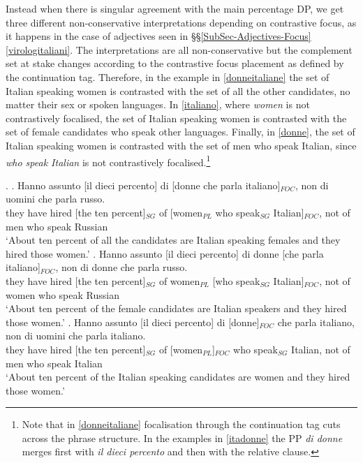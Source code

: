 \documentclass[charis, linguex]{glossa}
\begin{document}
Instead when there is singular agreement with the main percentage DP, we get three different non-conservative interpretations depending on contrastive focus, as it happens in the case of adjectives seen in \S\S\ref{SubSec-Adjectives-Focus} \ref{virologitaliani}. The interpretations are all non-conservative but the complement set at stake changes according to the contrastive focus placement as defined by the continuation tag. Therefore, in the example in \ref{donneitaliane} the set of Italian speaking women is contrasted with the set of all the other candidates, no matter their sex or spoken languages. In \ref{italiano}, where \textit{women} is not contrastively focalised, the set of Italian speaking women is contrasted with the set of female candidates who speak other languages. Finally, in \ref{donne}, the set of Italian speaking women is contrasted with the set of men who speak Italian, since \textit{who speak Italian} is not contrastively focalised.\footnote{Note that in \ref{donneitaliane} focalisation through the continuation tag cuts across the phrase structure. In the examples in \ref{itadonne}  the PP \emph{di donne} merges first with \emph{il dieci percento} and then with the relative clause.} 

\ex. \label{itadonne} \ag. Hanno assunto [il dieci percento] di [donne che parla italiano]$_{FOC}$, non di uomini che parla russo. \\
      {they have} hired [the ten percent]$_{SG}$ of [women$_{PL}$ who speak$_{SG}$ Italian]$_{FOC}$, not of men who speak Russian \\
	   \glt `About ten percent of all the candidates are Italian speaking females and they hired those women.' \label{donneitaliane}		
\bg. Hanno assunto [il dieci percento] di donne [che parla  italiano]$_{FOC}$, non di donne che parla russo. \\
     {they have} hired [the ten percent]$_{SG}$ of women$_{PL}$ [who speak$_{SG}$ Italian]$_{FOC}$, not of women who speak Russian \\
	  \glt `About ten percent of the female candidates are Italian speakers and they hired those women.' \label{italiano}
\cg. Hanno assunto [il dieci percento] di [donne]$_{FOC}$ che parla  italiano, non di uomini che parla italiano. \\
	      {they have} hired [the ten percent]$_{SG}$ of [women$_{PL}$]$_{FOC}$ who speak$_{SG}$ Italian, not of men who speak Italian \\
	  \glt	 `About ten percent of the Italian speaking candidates are women and they hired those women.' \label{donne}
 
\end{document}
